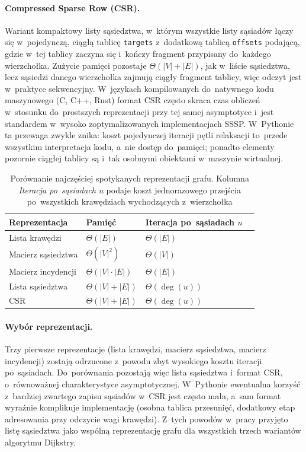 \paragraph{Compressed Sparse Row (CSR).}
Wariant kompaktowy listy sąsiedztwa, w~którym wszystkie listy sąsiadów łączy się
w~pojedynczą, ciągłą tablicę \texttt{targets} z~dodatkową tablicą \texttt{offsets} podającą,
gdzie w~tej tablicy zaczyna się i~kończy fragment przypisany do~każdego wierzchołka. Zużycie
pamięci pozostaje $\Theta(|V|+|E|)$, jak w~liście sąsiedztwa, lecz sąsiedzi danego
wierzchołka zajmują ciągły fragment tablicy, więc odczyt jest w~praktyce sekwencyjny.
W~językach kompilowanych
do~natywnego kodu maszynowego (C, C++, Rust) format CSR często skraca czas obliczeń
w~stosunku do~prostszych reprezentacji przy tej samej asymptotyce i~jest standardem
w~wysoko zoptymalizowanych implementacjach SSSP. W~Pythonie ta przewaga zwykle znika: koszt pojedynczej
iteracji pętli relaksacji to~przede wszystkim interpretacja kodu, a~nie dostęp do~pamięci;
ponadto elementy pozornie ciągłej tablicy są i~tak osobnymi obiektami w~maszynie wirtualnej.

\begin{table}[ht]
\centering
\caption{Porównanie najczęściej spotykanych reprezentacji grafu. Kolumna \emph{Iteracja po~sąsiadach $u$} podaje koszt jednorazowego przejścia
po~wszystkich krawędziach wychodzących z~wierzchołka}
\label{tab:impl:reprezentacje_grafu}
\begin{tabular}{l l l l}
\hline
\textbf{Reprezentacja} & \textbf{Pamięć} & \textbf{Iteracja po~sąsiadach $u$} \\
\hline
Lista krawędzi      & $\Theta(|E|)$            & $\Theta(|E|)$       \\
Macierz sąsiedztwa  & $\Theta(|V|^2)$          & $\Theta(|V|)$       \\
Macierz incydencji  & $\Theta(|V|\cdot|E|)$    & $\Theta(|E|)$       \\
Lista sąsiedztwa    & $\Theta(|V|+|E|)$        & $\Theta(\deg(u))$   \\
CSR                 & $\Theta(|V|+|E|)$        & $\Theta(\deg(u))$   \\
\hline
\end{tabular}
\end{table}

\paragraph{Wybór reprezentacji.}
Trzy pierwsze reprezentacje (lista krawędzi, macierz sąsiedztwa, macierz incydencji)
zostają odrzucone z~powodu zbyt wysokiego kosztu iteracji po~sąsiadach.
Do~porównania pozostają więc lista sąsiedztwa i~format CSR, o~równoważnej charakterystyce
asymptotycznej. W~Pythonie ewentualna korzyść z~bardziej zwartego zapisu sąsiadów w~CSR
jest często mała, a~sam format wyraźnie
komplikuje implementację (osobna tablica przesunięć, dodatkowy etap adresowania przy odczycie
wagi krawędzi). Z~tych powodów w~pracy przyjęto listę sąsiedztwa jako wspólną reprezentację grafu
dla wszystkich trzech wariantów algorytmu Dijkstry.


